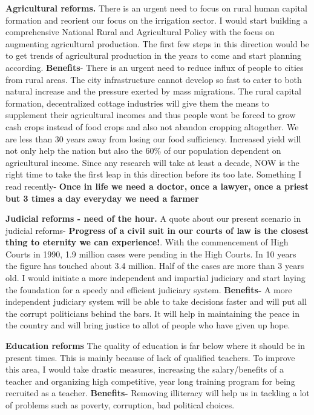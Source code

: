 \documentclass{article}
\begin{document}
\textbf{Agricultural reforms.} There is an urgent need to focus on rural human capital formation and reorient our focus on the irrigation sector. I would start building a comprehensive National Rural and Agricultural Policy with the focus on augmenting agricultural production. The first few steps in this direction would be to get trends of agricultural production in the years to come and start planning according. \textbf{Benefits}- There is an urgent need to reduce influx of people to cities from rural areas. The city infrastructure cannot develop so fast to cater to both natural increase and the pressure exerted by mass migrations. The rural capital formation, decentralized cottage industries will give them the means to supplement their agricultural incomes and thus people wont be forced to grow cash crops instead of food crops and also not abandon cropping altogether. We are less than 30 years away from losing our food sufficiency. Increased yield will not only help the nation but also the 60\% of our population dependent on agricultural income. Since any research will take at least a decade, NOW is the right time to take the first leap in this direction before its too late. Something I read recently- \textbf{Once in life we need a doctor, once a lawyer, once a priest but 3 times a day everyday we need a farmer}

\textbf{Judicial reforms - need of the hour.} 
A quote about our present scenario in judicial reforms- \textbf{Progress of a civil suit in our courts of law is the closest thing to eternity we can experience!}. With the commencement of High Courts in 1990, 1.9 million cases were pending in the High Courts. In 10 years the figure has touched about 3.4 million. Half of the cases are more than 3 years old. I would initiate a more independent and impartial judiciary and start laying the foundation for a speedy and efficient judiciary system.  \textbf{Benefits-} A more independent judiciary system will be able to take decisions faster and will put all the corrupt politicians behind the bars. It will help in maintaining the peace in the country and will bring justice to allot of people who have given up hope.

\textbf{Education reforms}
The quality of education is far below where it should be in present times. This is mainly because of lack of qualified teachers. To improve this area, I would take drastic measures, increasing the salary/benefits of a teacher and organizing high competitive, year long training program for being recruited as a teacher. \textbf{Benefits-} Removing illiteracy will help us in tackling a lot of problems such as poverty, corruption, bad political choices.
\end{document}
